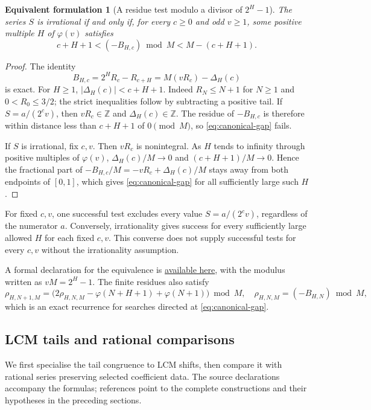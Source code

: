 \documentclass[11pt]{article}
\theoremstyle{plain}
\newtheorem{equivform}[thm]{Equivalent formulation}
\theoremstyle{definition}
\theoremstyle{remark}
\newcommand{\Z}{\mathbb{Z}}
\newcommand{\ph}{\varphi}
\begin{document}
\begin{equivform}[A residue test modulo a divisor of $2^H-1$]\label{res:canonicalmersenne}
The series $S$ is irrational if and only if, for every $c\ge0$ and odd
$v\ge1$, some positive multiple $H$ of $\ph(v)$ satisfies
\begin{equation}\label{eq:canonical-gap}
 c+H+1<(-B_{H,c})\bmod M<M-(c+H+1).
\end{equation}
\end{equivform}
\begin{proof}
The identity
\[
 B_{H,c}=2^HR_c-R_{c+H}=M(vR_c)-\Delta_H(c)
\]
is exact. For $H\ge1$, $|\Delta_H(c)|<c+H+1$. Indeed $R_N\le N+1$
for $N\ge1$ and $0<R_0\le3/2$; the strict inequalities follow by subtracting
a positive tail. If $S=a/(2^cv)$, then $vR_c\in\Z$ and
$\Delta_H(c)\in\Z$. The residue of $-B_{H,c}$ is therefore within distance
less than $c+H+1$ of $0\pmod M$, so \eqref{eq:canonical-gap} fails.

If $S$ is irrational, fix $c,v$. Then $vR_c$ is nonintegral. As $H$ tends
to infinity through positive multiples of $\ph(v)$,
$\Delta_H(c)/M\to0$ and $(c+H+1)/M\to0$. Hence the fractional part of
$-B_{H,c}/M=-vR_c+\Delta_H(c)/M$ stays away from both endpoints of $[0,1]$,
which gives \eqref{eq:canonical-gap} for all sufficiently large such $H$.
\end{proof}
For fixed $c,v$, one successful test excludes every value
$S=a/(2^cv)$, regardless of the numerator $a$. Conversely,
irrationality gives success for every sufficiently large allowed $H$
for each fixed $c,v$. This converse does not supply successful tests
for every $c,v$ without the irrationality assumption.

A formal declaration for the equivalence is
\href{https://github.com/wcook04/plectis-erdos/blob/c91562bd574a387cde904481e609c7b4cacebb14/lean/ErdosProblems/Erdos249/CyclotomicAnchoredKill.lean\#L3165}{available here},
with the modulus written as $vM=2^H-1$.
The finite residues also satisfy
\[
 \rho_{H,N+1,M}=
 \bigl(2\rho_{H,N,M}-\ph(N+H+1)+\ph(N+1)\bigr)\bmod M,
 \quad \rho_{H,N,M}=(-B_{H,N})\bmod M,
\]
which is an exact recurrence for searches directed at \eqref{eq:canonical-gap}.


\subsection{LCM tails and rational comparisons}\label{long249:r3-comparisons}
We first specialise the tail congruence to LCM shifts, then compare
it with rational series preserving selected coefficient data. The
source declarations accompany the formulas; references point to the
complete constructions and their hypotheses in the preceding sections.
\end{document}

